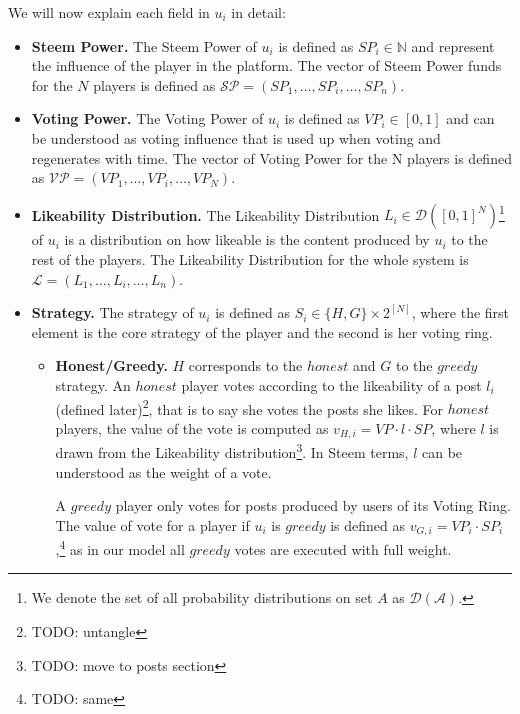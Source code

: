       We will now explain each field in $u_i$ in detail:
      \begin{itemize}
        \item \textbf{Steem Power.} The Steem Power of $u_i$ is defined as
        $SP_{i} \in \mathbb{N}$ and represent the influence of the player in the
        platform. The vector of Steem Power funds for the $N$ players is defined
        as $\mathcal{SP} = \left(SP_{1}, \dots, SP_{i}, \dots, SP_{n}\right)$.
        \item \textbf{Voting Power.} The Voting Power of $u_i$ is defined as
        $VP_i \in \left[0, 1\right]$ and can be understood as  voting influence
        that is used up when voting and regenerates with time. The vector of
        Voting Power for the N players is defined as $\mathcal{VP} = \left(VP_1,
        \dots, VP_i, \dots, VP_N\right)$.

        \item \textbf{Likeability Distribution.} The Likeability Distribution
        $L_i\in \mathcal{D}\left([0,1]^N\right)$\footnote{We denote the set of
        all probability distributions on set $A$ as $\mathcal{D\left(A\right)}$.}
        of $u_i$ is a distribution on how likeable is the content produced by
        $u_i$ to the rest of the players. The Likeability Distribution for the
        whole system is $\mathcal{L} = \left(L_1, \dots, L_i, \dots, L_n\right)$.

        \item \textbf{Strategy.} The strategy of $u_i$ is defined as $S_i \in
        \lbrace H, G \rbrace \times 2^{\left[N\right]}$, where the first element
        is the core strategy of the player and the second is her voting ring.
        \begin{itemize}
          \item \textbf{Honest/Greedy.} $H$ corresponds to the $honest$ and $G$
          to the $greedy$ strategy. An $honest$ player votes according to the
          likeability of a post $l_i$ (defined later)\footnote{TODO: untangle},
          that is to say she votes the posts she likes. For $honest$ players, the
          value of the vote is computed as $v_{H,i} = VP \cdot l \cdot SP$, where
          $l$ is drawn from the Likeability distribution\footnote{TODO: move to
          posts section}. In Steem terms, $l$ can be understood as the weight of
          a vote.

          A $greedy$ player only votes for posts produced by users of its
          Voting Ring. The value of vote for a player if $u_i$ is $greedy$ is
          defined as $v_{G,i} = VP_i \cdot SP_i$,\footnote{TODO: same} as in our
          model all $greedy$ votes are executed with full weight.


\end{itemize}
\end{itemize}
